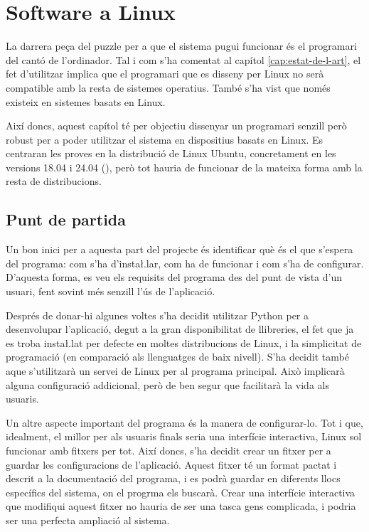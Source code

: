 \chapter{Software a Linux}

La darrera peça del puzzle per a que el sistema pugui funcionar és el
programari del cantó de l'ordinador. Tal i com s'ha comentat al capítol
\ref{cap:estat-de-l-art}, el fet d'utilitzar  implica que el
programari que es disseny per Linux no serà compatible amb la resta de
sistemes operatius. També s'ha vist que  només existeix en sistemes
basats en Linux.

Així doncs, aquest capítol té per objectiu dissenyar un programari senzill però
robust per a poder utilitzar el sistema en dispositius basats en Linux. Es
centraran les proves en la distribució de Linux Ubuntu, concretament en
les versions 18.04 i 24.04  (), però tot hauria
de funcionar de la mateixa forma amb la resta de distribucions.

\section{Punt de partida}

Un bon inici per a aquesta part del projecte és identificar què és el que
s'espera del programa: com s'ha d'insta\l.lar, com ha de funcionar i com
s'ha de configurar. D'aquesta forma, es veu els requisits del programa des del
punt de vista d'un usuari, fent sovint més senzill l'ús de l'aplicació.

Després de donar-hi algunes voltes s'ha decidit utilitzar Python per a
desenvolupar l'aplicació, degut a la gran disponibilitat de llibreries, el fet
que ja es troba insta\l.lat per defecte en moltes distribucions de Linux, i
la simplicitat de programació (en comparació als llenguatges de baix nivell).
S'ha decidit també aque s'utilitzarà un servei de Linux per al programa principal.
Això implicarà alguna configuració addicional, però de ben segur que facilitarà
la vida als usuaris.

Un altre aspecte important del programa és la manera de configurar-lo. Tot i que,
idealment, el millor per als usuaris finals seria una interfície interactiva,
Linux sol funcionar amb fitxers per tot. Així doncs, s'ha decidit crear un fitxer
 per a guardar les configuracions de l'aplicació. Aquest fitxer té
un format pactat i descrit a la documentació del programa, i es podrà guardar en
diferents llocs específics del sistema, on el progrma els buscarà. Crear una
interfície interactiva que modifiqui aquest fitxer no hauria de ser una tasca
gens complicada, i podria ser una perfecta ampliació al sistema.

